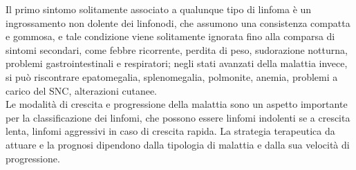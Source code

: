 Il primo sintomo solitamente associato a qualunque tipo di linfoma è un ingrossamento non dolente dei linfonodi,
che assumono una consistenza compatta e gommosa, e tale condizione viene solitamente ignorata
fino alla comparsa di sintomi secondari, come febbre ricorrente, perdita di peso,
sudorazione notturna, problemi gastrointestinali e respiratori; negli stati avanzati della malattia invece,
si può riscontrare epatomegalia, splenomegalia, polmonite, anemia, problemi a carico del SNC, alterazioni cutanee.\\

Le modalità di crescita e progressione della malattia sono un aspetto importante
per la classificazione dei linfomi, che possono essere linfomi indolenti se
a crescita lenta, linfomi aggressivi in caso di crescita rapida. 
La strategia terapeutica da attuare e la prognosi dipendono dalla tipologia di
malattia e dalla sua velocità di progressione.





